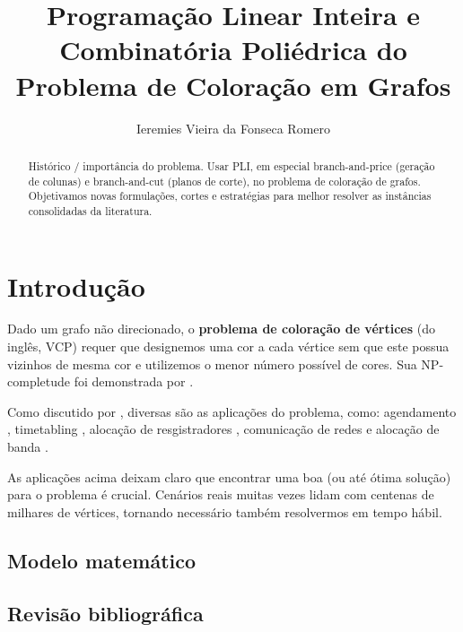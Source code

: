 \documentclass[11pt]{article}
\author{Ieremies Vieira da Fonseca Romero}
\date{}
\title{Programação Linear Inteira e Combinatória Poliédrica do Problema de Coloração em Grafos}
\begin{document}
\maketitle
\begin{abstract}
Histórico / importância do problema.
Usar PLI, em especial branch-and-price (geração de colunas) e branch-and-cut (planos de corte), no problema de coloração de grafos.
Objetivamos novas formulações, cortes e estratégias para melhor resolver as instâncias consolidadas da literatura.
\end{abstract}

\section{Introdução}
\label{sec:org29de433}
Dado um grafo não direcionado, o \textbf{problema de coloração de vértices} (do inglês, VCP) requer que designemos uma cor a cada vértice sem que este possua vizinhos de mesma cor e utilizemos o menor número possível de cores.
Sua NP-completude foi demonstrada por \textcite{Garey1979ComputersIntractabilityGuide}.

Como discutido por \autocite{Malaguti2010SurveyVertexColoring}, diversas são as aplicações do problema, como: agendamento \autocite{Leighton1979GraphColoringAlgorithm}, timetabling \autocite{Werra1985introductiontimetabling}, alocação de resgistradores \autocite{Chow1990prioritybasedcoloring}, comunicação de redes \autocite{Caprara2007PassengerRailwayOptimization} e alocação de banda \autocite{Gamst1986Somelowerbounds}.

As aplicações acima deixam claro que encontrar uma boa (ou até ótima solução) para o problema é crucial. Cenários reais muitas vezes lidam com centenas de milhares de vértices, tornando necessário também resolvermos em tempo hábil. 

\subsection{Modelo matemático}
\label{sec:org82bf7f9}
\subsection{Revisão bibliográfica}
\label{sec:org163faf0}
\end{document}
